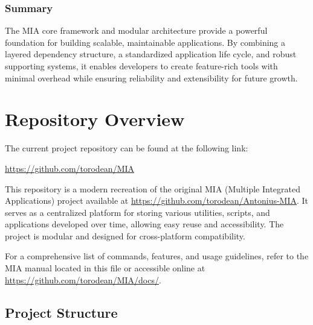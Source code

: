 \subsubsection{Summary}
The MIA core framework and modular architecture provide a powerful foundation for building scalable, maintainable applications. By combining a layered dependency structure, a standardized application life cycle, and robust supporting systems, it enables developers to create feature-rich tools with minimal overhead while ensuring reliability and extensibility for future growth.





























\section{Repository Overview}

The current project repository can be found at the following link:
\begin{center}
	\url{https://github.com/torodean/MIA}
\end{center}
This repository is a modern recreation of the original MIA (Multiple Integrated Applications) project available at \url{https://github.com/torodean/Antonius-MIA}. It serves as a centralized platform for storing various utilities, scripts, and applications developed over time, allowing easy reuse and accessibility. The project is modular and designed for cross-platform compatibility.

For a comprehensive list of commands, features, and usage guidelines, refer to the MIA manual located in this file or accessible online at \url{https://github.com/torodean/MIA/docs/}.

\subsection{Project Structure}

